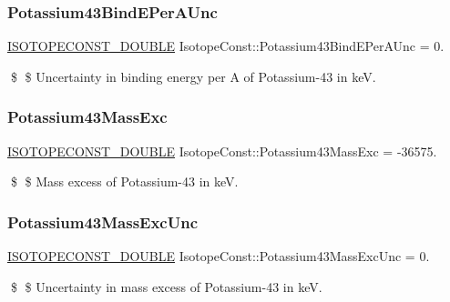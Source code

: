 \subsubsection{\texorpdfstring{Potassium43\+Bind\+E\+Per\+A\+Unc}{Potassium43BindEPerAUnc}}
{\footnotesize\ttfamily \mbox{\hyperlink{group___isotope_const-_macros_ga8f45a7272ce02c0b4c65c44636ed719a}{I\+S\+O\+T\+O\+P\+E\+C\+O\+N\+S\+T\+\_\+\+D\+O\+U\+B\+LE}} Isotope\+Const\+::\+Potassium43\+Bind\+E\+Per\+A\+Unc = 0.}

\$ \$ Uncertainty in binding energy per A of Potassium-\/43 in keV. \mbox{\label{group___isotope_const-_potassium-_k43_ga58116649969c9b31470377235f428fca}} 
\subsubsection{\texorpdfstring{Potassium43\+Mass\+Exc}{Potassium43MassExc}}
{\footnotesize\ttfamily \mbox{\hyperlink{group___isotope_const-_macros_ga8f45a7272ce02c0b4c65c44636ed719a}{I\+S\+O\+T\+O\+P\+E\+C\+O\+N\+S\+T\+\_\+\+D\+O\+U\+B\+LE}} Isotope\+Const\+::\+Potassium43\+Mass\+Exc = -\/36575.}

\$ \$ Mass excess of Potassium-\/43 in keV. \mbox{\label{group___isotope_const-_potassium-_k43_ga6735d69e1daf8d15069983519319f392}} 
\subsubsection{\texorpdfstring{Potassium43\+Mass\+Exc\+Unc}{Potassium43MassExcUnc}}
{\footnotesize\ttfamily \mbox{\hyperlink{group___isotope_const-_macros_ga8f45a7272ce02c0b4c65c44636ed719a}{I\+S\+O\+T\+O\+P\+E\+C\+O\+N\+S\+T\+\_\+\+D\+O\+U\+B\+LE}} Isotope\+Const\+::\+Potassium43\+Mass\+Exc\+Unc = 0.}

\$ \$ Uncertainty in mass excess of Potassium-\/43 in keV. \mbox{\label{group___isotope_const-_potassium-_k43_ga7b98b9e43b6eaa2c6914d145e625d44a}} 
